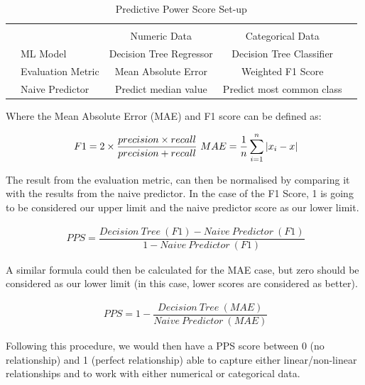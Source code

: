 \begin{appendices}
{
\begin{table}[h!]
\centering
\begin{tabular}{l|l|c|c|c}
\multicolumn{2}{c}{}&\multicolumn{2}{c}{}&\\
\cline{3-4}
\multicolumn{2}{c|}{}&Numeric Data &Categorical Data &\multicolumn{1}{c}{}\\
\cline{2-4}
\multirow{}{}{}& ML Model & Decision Tree Regressor & Decision Tree Classifier & \\
\cline{2-4}
& Evaluation Metric & Mean Absolute Error & Weighted F1 Score & \\
\cline{2-4}
& Naive Predictor & Predict median value & Predict most common class & \\
\cline{2-4}
\end{tabular}
\caption{Predictive Power Score Set-up}
\label{setup}
\end{table}
}

Where the Mean Absolute Error (MAE) and F1 score can be defined as:

\useshortskip
\begin{align}
\ F1 = 2 \times \dfrac{precision \times recall}{precision + recall}
\ MAE = \dfrac{1}{n}\sum_{i=1}^{n}\abs{x_{i} - x}
\end{align}
\useshortskip

The result from the evaluation metric, can then be normalised by comparing it with the results from the naive predictor. In the case of the F1 Score, 1 is going to be considered our upper limit and the naive predictor score as our lower limit.

\useshortskip
\begin{align}
\ PPS = \dfrac{Decision\:Tree\:(F1) - Naive\:Predictor\:(F1)}{1 - Naive\:Predictor\:(F1)}
\end{align}
\useshortskip

A similar formula could then be calculated for the MAE case, but zero should be considered as our lower limit (in this case, lower scores are considered as better).

\useshortskip
\begin{align}
\ PPS = 1 - \dfrac{Decision\:Tree\:(MAE)}{Naive\:Predictor\:(MAE)}
\end{align}
\useshortskip

Following this procedure, we would then have a PPS score between 0 (no relationship) and 1 (perfect relationship) able to capture either linear/non-linear relationships and to work with either numerical or categorical data. 


\end{appendices}
